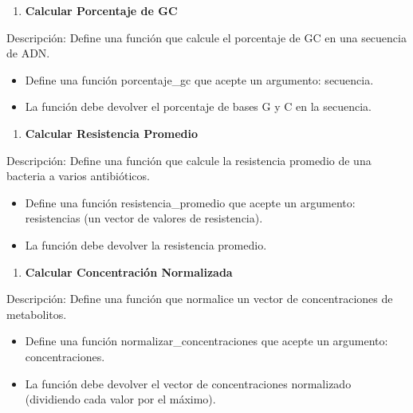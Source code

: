 \documentclass[
]{book}
\providecommand{\tightlist}{%
  \setlength{\itemsep}{0pt}\setlength{\parskip}{0pt}}
\begin{document}
\begin{enumerate}
\def\labelenumi{\arabic{enumi}.}
\setcounter{enumi}{11}
\tightlist
\item
  \textbf{Calcular Porcentaje de GC}
\end{enumerate}

Descripción: Define una función que calcule el porcentaje de GC en una secuencia de ADN.

\begin{itemize}
\tightlist
\item
  Define una función porcentaje\_gc que acepte un argumento: secuencia.
\item
  La función debe devolver el porcentaje de bases G y C en la secuencia.
\end{itemize}

\begin{enumerate}
\def\labelenumi{\arabic{enumi}.}
\setcounter{enumi}{12}
\tightlist
\item
  \textbf{Calcular Resistencia Promedio}
\end{enumerate}

Descripción: Define una función que calcule la resistencia promedio de una bacteria a varios antibióticos.

\begin{itemize}
\tightlist
\item
  Define una función resistencia\_promedio que acepte un argumento: resistencias (un vector de valores de resistencia).
\item
  La función debe devolver la resistencia promedio.
\end{itemize}

\begin{enumerate}
\def\labelenumi{\arabic{enumi}.}
\setcounter{enumi}{13}
\tightlist
\item
  \textbf{Calcular Concentración Normalizada}
\end{enumerate}

Descripción: Define una función que normalice un vector de concentraciones de metabolitos.

\begin{itemize}
\tightlist
\item
  Define una función normalizar\_concentraciones que acepte un argumento: concentraciones.
\item
  La función debe devolver el vector de concentraciones normalizado (dividiendo cada valor por el máximo).
\end{itemize}
\end{document}
